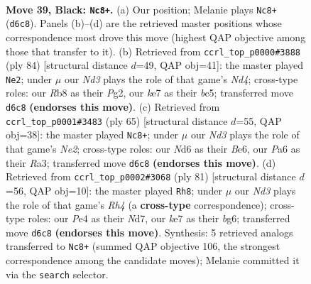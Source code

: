 \documentclass[11pt]{article}
\begin{document}
\clearpage

\begin{figure}[p]\centering
\begin{subfigure}{0.46\textwidth}\centering
\resizebox{\linewidth}{!}{%
\newchessgame
\chessboard[
  setfen={1r4k1/2p1Kp1p/p1Pn4/P4p2/4p3/5bP1/8/RNB5 b - - 9 39},
  showmover=false,
  pgfstyle=straightmove, color=movearrow, markmove={d6-c8}
]}
\caption{}
\end{subfigure}\hfill
\begin{subfigure}{0.46\textwidth}\centering
\resizebox{\linewidth}{!}{%
\newchessgame
\chessboard[
  setfen={8/1b3p2/6p1/p1b1k3/B1PN3p/1P1K1P1P/6P1/8 w - - 1 43},
  showmover=false,
  pgfstyle=straightmove, color=movearrow, markmove={d4-e2}
]}
\caption{}
\end{subfigure}
\\[4pt]
\begin{subfigure}{0.46\textwidth}\centering
\resizebox{\linewidth}{!}{%
\newchessgame
\chessboard[
  setfen={8/4npk1/3Kb1p1/7p/4P2P/r1P5/4B1P1/3N3R b - - 5 33},
  showmover=false,
  pgfstyle=straightmove, color=movearrow, markmove={e7-c8}
]}
\caption{}
\end{subfigure}\hfill
\begin{subfigure}{0.46\textwidth}\centering
\resizebox{\linewidth}{!}{%
\newchessgame
\chessboard[
  setfen={3k4/p2n4/1p4B1/2pP3r/b1P2pNp/P6K/5P2/4R3 b - - 6 41},
  showmover=false,
  pgfstyle=straightmove, color=movearrow, markmove={h5-h8}
]}
\caption{}
\end{subfigure}
\caption{\textbf{Move 39, Black: \texttt{Nc8+}.} (a) Our position; Melanie plays \texttt{Nc8+} (\texttt{d6c8}). Panels (b)--(d) are the retrieved master positions whose correspondence most drove this move (highest QAP objective among those that transfer to it). (b) Retrieved from \texttt{ccrl\_top\_p0000\#3888} (ply 84) [structural distance $d$=49, QAP obj=41]: the master played \texttt{Ne2}; under $\mu$ our \emph{Nd3} plays the role of that game's \emph{Nd4}; cross-type roles: our \emph{R}b8 as their \emph{P}g2, our \emph{k}e7 as their \emph{b}c5; transferred move \texttt{d6c8} \textbf{(endorses this move)}. (c) Retrieved from \texttt{ccrl\_top\_p0001\#3483} (ply 65) [structural distance $d$=55, QAP obj=38]: the master played \texttt{Nc8+}; under $\mu$ our \emph{Nd3} plays the role of that game's \emph{Ne2}; cross-type roles: our \emph{N}d6 as their \emph{B}e6, our \emph{P}a6 as their \emph{R}a3; transferred move \texttt{d6c8} \textbf{(endorses this move)}. (d) Retrieved from \texttt{ccrl\_top\_p0002\#3068} (ply 81) [structural distance $d$=56, QAP obj=10]: the master played \texttt{Rh8}; under $\mu$ our \emph{Nd3} plays the role of that game's \emph{Rh4} (a \textbf{cross-type} correspondence); cross-type roles: our \emph{P}e4 as their \emph{N}d7, our \emph{k}e7 as their \emph{b}g6; transferred move \texttt{d6c8} \textbf{(endorses this move)}. Synthesis: 5 retrieved analogs transferred to \texttt{Nc8+} (summed QAP objective 106, the strongest correspondence among the candidate moves); Melanie committed it via the \texttt{search} selector.}
\label{fig:thought-m77}
\end{figure}
\end{document}
